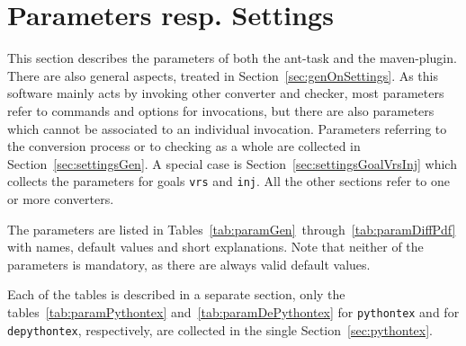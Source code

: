 
\chapter{Parameters resp. Settings}\label{chap:settings}

This section describes the parameters 
of both the ant-task and the maven-plugin. 
There are also general aspects, treated in Section~\ref{sec:genOnSettings}. 
As this software mainly acts by invoking other converter and checker, 
most parameters refer to commands and options for invocations, 
but there are also parameters which cannot be associated to an individual invocation. 
Parameters referring to the conversion process or to checking 
as a whole are collected in Section~\ref{sec:settingsGen}. 
A special case is Section~\ref{sec:settingsGoalVrsInj} 
which collects the parameters for goals \texttt{vrs} and \texttt{inj}. 
All the other sections refer to one or more converters. 

The parameters are listed 
in Tables~\ref{tab:paramGen}~through~\ref{tab:paramDiffPdf} 
with names, default values and short explanations. 
Note that neither of the parameters is mandatory, 
as there are always valid default values. 

Each of the tables is described in a separate section, 
only the tables~\ref{tab:paramPythontex} and~\ref{tab:paramDePythontex} 
for \texttt{pythontex} and for \texttt{depythontex}, respectively, 
are collected in the single Section~\ref{sec:pythontex}. 


